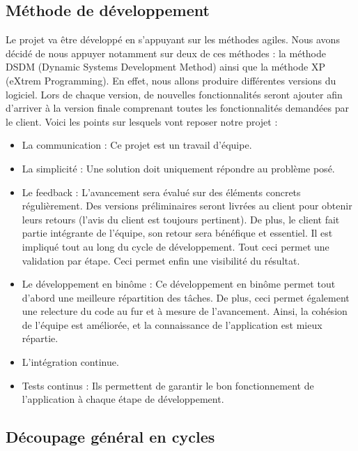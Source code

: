 \documentclass{../res/univ-projet}
\begin{document}
  \subsection{Méthode de développement}
    Le projet va être développé en s’appuyant sur les méthodes agiles. Nous avons décidé de nous appuyer notamment sur deux de ces méthodes : la méthode DSDM (Dynamic Systems Development Method) ainsi que la méthode XP (eXtrem Programming). En effet, nous allons produire différentes versions du logiciel. Lors de chaque version, de nouvelles fonctionnalités seront ajouter afin d’arriver à la version finale comprenant toutes les fonctionnalités demandées par le client. Voici les points sur lesquels vont reposer notre projet :
    \begin{itemize}
      \item La communication : Ce projet est un travail d’équipe.
      \item La simplicité : Une solution doit uniquement répondre au problème posé.
      \item Le feedback : L’avancement sera évalué sur des éléments concrets régulièrement. Des versions préliminaires seront livrées au client pour obtenir leurs retours (l’avis du client est toujours pertinent). De plus, le client fait partie intégrante de l’équipe, son retour sera bénéfique et essentiel. Il est impliqué tout au long du cycle de développement. Tout ceci permet une validation par étape. Ceci permet enfin une visibilité du résultat. 
      \item Le développement en binôme : Ce développement en binôme permet tout d’abord une meilleure répartition des tâches. De plus, ceci permet également une relecture du code au fur et à mesure de l’avancement. Ainsi, la cohésion de l’équipe est améliorée, et la connaissance de l’application est mieux répartie.
      \item L’intégration continue.
      \item Tests continus : Ils permettent de garantir le bon fonctionnement de l’application à chaque étape de développement.
    \end{itemize}
  \begin{landscape} 
  \subsection{Découpage général en cycles}
   
  \end{landscape}
\end{document}
